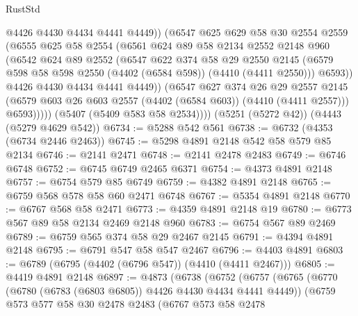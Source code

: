 \begin{lexlean}{RustStd}
\begin{coremodule}
                  @4426
                  @4430
                  @4434
                  @4441
                  @4449))
              (@6547
                @625
                @629
                @58
                @30
                @2554
                @2559
                (@6555
                  @625
                  @58
                  @2554
                  (@6561
                    @624
                    @89
                    @58
                    @2134
                    @2552
                    @2148
                    @960
                    (@6542
                      @624
                      @89
                      @2552
                      (@6547
                        @622
                        @374
                        @58
                        @29
                        @2550
                        @2145
                        (@6579 @598 @58 @598 @2550 (@4402 (@6584 @598)) (@4410 (@4411 @2550)))
                        @6593))
                    @4426
                    @4430
                    @4434
                    @4441
                    @4449))
                (@6547
                  @627
                  @374
                  @26
                  @29
                  @2557
                  @2145
                  (@6579 @603 @26 @603 @2557 (@4402 (@6584 @603)) (@4410 (@4411 @2557)))
                  @6593)))))
        (@5407 (@5409 @583 @58 @2534))))
    (@5251 (@5272 @42))
    (@4443 (@5279 @4629 @542))
@6734 := @5288 @542 @561
@6738 := @6732 (@4353 (@6734 @2446 @2463))
@6745 := @5298 @4891 @2148 @542 @58 @579 @85 @2134
@6746 := @2141 @2471
@6748 := @2141 @2478 @2483
@6749 := @6746 @6748
@6752 := @6745 @6749 @2465 @6371
@6754 := @4373 @4891 @2148
@6757 := @6754 @579 @85 @6749
@6759 := @4382 @4891 @2148
@6765 := @6759 @568 @578 @58 @60 @2471 @6748
@6767 := @5354 @4891 @2148
@6770 := @6767 @568 @58 @2471
@6773 := @4359 @4891 @2148 @19
@6780 := @6773 @567 @89 @58 @2134 @2469 @2148 @960
@6783 := @6754 @567 @89 @2469
@6789 := @6759 @565 @374 @58 @29 @2467 @2145
@6791 := @4394 @4891 @2148
@6795 := @6791 @547 @58 @547 @2467
@6796 := @4403 @4891
@6803 := @6789 (@6795 (@4402 (@6796 @547)) (@4410 (@4411 @2467)))
@6805 := @4419 @4891 @2148
@6897 := @4873
    (@6738
      (@6752
        (@6757
          (@6765
            (@6770 (@6780 (@6783 (@6803 @6805)) @4426 @4430 @4434 @4441 @4449))
            (@6759
              @573
              @577
              @58
              @30
              @2478
              @2483
              (@6767
                @573
                @58
                @2478

\end{coremodule}
\end{lexlean}
